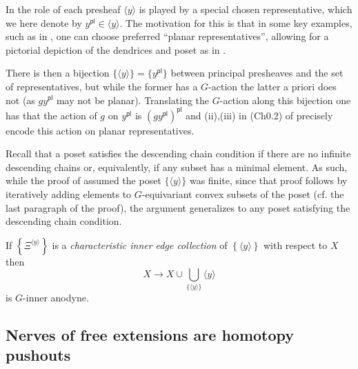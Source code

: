 \documentclass[a4paper,10pt
,draft
]{article}%
\renewcommand{\1}{\eta}%
\begin{document}
\begin{remark}\label{CH02 REM}
In \cite[Rem. 3.7]{BP_edss} the role of each presheaf 
$\langle y \rangle$ is played by a special chosen representative,
which we here denote by
$y^{\mathsf{pl}} \in \langle y \rangle$. 
The motivation for this is that in some key examples, such as in \cite[Ex. 3.9]{BP_edss}, one can choose preferred ``planar representatives'',
allowing for a pictorial depiction of the dendrices and poset as in
\cite[Fig. 3.1]{BP_edss}. 

There is then a bijection $\{\langle y \rangle\} = \{ y^{\mathsf{pl}}\}$ between principal presheaves and the set of representatives, but while the former has a $G$-action the latter a priori does not (as $gy^{\mathsf{pl}}$ may not be planar). Translating the $G$-action along this bijection one has that the action of $g$ on $y^{\mathsf{pl}}$ is
$(g y^{\mathsf{pl}})^{\mathsf{pl}}$ and (ii),(iii) in 
(Ch0.2) of \cite[Rem. 3.7]{BP_edss} precisely 
encode this action on planar representatives.
\end{remark}

\begin{remark}\label{DCC REM}
Recall that a poset satisfies the descending chain condition if there are no infinite descending chains or, equivalently, if any subset has a minimal element. As such, while the proof of \cite[Lemma 3.4]{BP_edss}
assumed the poset $\{\langle y \rangle\}$ was finite,
since that proof follows by iteratively adding elements to $G$-equivariant convex subsets of the poset (cf. the last paragraph of the proof), the argument generalizes to any poset satisfying the descending chain condition.
\end{remark}

\begin{lemma}
      \label{CHAREDGE LEM}
If
$
\left\{ \Xi^{\langle y \rangle} \right \} 
$
is a \emph{characteristic inner edge collection} 
of $\left\{ \langle y \rangle \right\}$ with respect to $X$ then
\begin{equation}\label{CHAREDGE EQ}
X \to X \cup \bigcup_{\{\langle y \rangle\}} \langle y \rangle
\end{equation}
is $G$-inner anodyne.
\end{lemma}



\subsection{Nerves of free extensions are homotopy pushouts}
\end{document}
